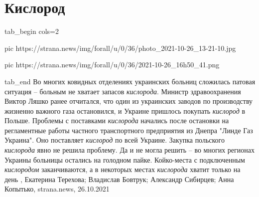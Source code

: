  
 
 
 
 
\chapter{Кислород}

\ifcmt
  tab_begin cols=2

     pic https://strana.news/img/forall/u/0/36/photo_2021-10-26_13-21-10.jpg

     pic https://strana.news/img/forall/u/0/36/2021-10-26_16h50_41.png

  tab_end
\fi
Во многих ковидных отделениях украинских больниц сложилась патовая ситуация –
больным не хватает запасов \emph{кислорода}.  Министр здравоохранения Виктор Ляшко
ранее отчитался, что один из украинских заводов по производству жизненно
важного газа остановился, и Украине пришлось покупать \emph{кислород} в Польше.
Проблемы с поставками \emph{кислорода} начались после остановки на регламентные работы
частного транспортного предприятия из Днепра "Линде Газ Украина". Оно
поставляет \emph{кислород} по всей Украине.  Закупка польского \emph{кислорода} явно не
решила проблему. Да и не могла решить – во многих регионах Украины больницы
остались на голодном пайке. Койко-места с подключенным \emph{кислородом}
заканчиваются, а в некоторых местах \emph{кислорода} хватит только на день
, 
Екатерина Терехова; Владислав Бовтрук; Александр Сибирцев; Анна Копытько, strana.news, 26.10.2021
